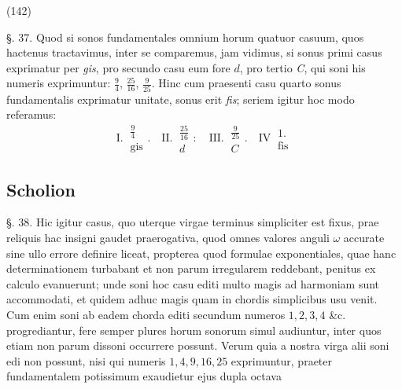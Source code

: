 \documentclass[11pt,a4paper]{article}
\begin{document}
(142)

§. 37. Quod si sonos fundamentales omnium horum quatuor casuum,
quos hactenus tractavimus, inter se comparemus, jam vidimus, si 
sonus primi casus exprimatur per \emph{gis}, pro secundo casu eum fore $d$,
 pro tertio \emph{C}, qui soni his numeris exprimuntur: $\frac{9}{4}$, $\frac{25}{16}$, $\frac{9}{25}$.
Hinc cum praesenti casu quarto sonus fundamentalis exprimatur
unitate, sonus erit \emph{fis}; seriem igitur hoc modo referamus:
\[ \text{I.}\ \begin{array}{c}\frac{9}{4}\\ \text{gis}\end{array}.\quad
\text{II.}\ \begin{array}{c}\frac{25}{16}\\ d\end{array}:\quad
\text{III.}\ \begin{array}{c}\frac{9}{25}\\ C\end{array}.\quad
\text{IV}\ \begin{array}{c}1.\\ \text{fis}\end{array} \]

\subsection{Scholion}

§. 38. Hic igitur casus, quo uterque virgae terminus simpliciter
est fixus, prae reliquis hac insigni gaudet praerogativa, quod
omnes valores anguli $\omega$ accurate sine ullo errore definire liceat,
propterea quod formulae exponentiales, quae hanc determinationem
turbabant et non parum irregularem reddebant, penitus ex calculo
evanuerunt; unde soni hoc casu editi multo magis ad harmoniam
sunt  accommodati, et quidem adhuc magis quam in
chordis simplicibus usu venit. Cum enim soni ab eadem chorda
editi secundum numeros $1, 2, 3, 4$ \&c. progrediantur, fere semper
plures horum sonorum simul audiuntur, inter quos etiam non
parum dissoni occurrere possunt. Verum quia a nostra virga
alii soni edi non possunt, nisi qui numeris $1, 4, 9, 16, 25$ exprimuntur,
praeter fundamentalem potissimum exaudietur ejus dupla octava
\end{document}
